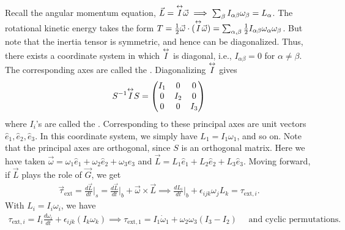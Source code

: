Recall the angular momentum equation, $\vec{L} = \overset{\leftrightarrow}{I} \vec{\omega} \implies \sum_{\beta} I_{\alpha \beta} \omega_{\beta} = L_{\alpha}$. The rotational kinetic energy takes the form $T = \frac{1}{2} \vec{\omega} \cdot (\overset{\leftrightarrow}{I} \vec{\omega}) = \sum_{\alpha,\beta} \frac{1}{2} I_{\alpha \beta} \omega_{\alpha} \omega_{\beta}$. But note that the inertia tensor is symmetric, and hence can be diagonalized. Thus, there exists a coordinate system in which $\overset{\leftrightarrow}{I}$ is diagonal, i.e., $I_{\alpha \beta} = 0$ for $\alpha \neq \beta$. The corresponding axes are called the . Diagonalizing $\overset{\leftrightarrow}{I}$ gives
\begin{align}
    S^{-1} \overset{\leftrightarrow}{I} S = \begin{pmatrix}
        I_{1} & 0 & 0 \\
        0 & I_{2} & 0 \\
        0 & 0 & I_{3}
    \end{pmatrix}
\end{align}
where $I_{i}$'s are called the . Corresponding to these principal axes are unit vectors $\hat{e}_{1},\hat{e}_{2},\hat{e}_{3}$. In this coordinate system, we simply have $L_{1} = I_{1}\omega_{1}$, and so on. Note that the principal axes are orthogonal, since $S$ is an orthogonal matrix. Here we have taken $\vec{\omega} = \omega_{1} \hat{e}_{1} + \omega_{2} \hat{e}_{2} + \omega_{3} \hat{e}_{3}$ and $\vec{L} = L_{1} \hat{e}_{1} + L_{2} \hat{e}_{2} + L_{3} \hat{e}_{3}$. Moving forward, if $\vec{L}$ plays the role of $\vec{G}$, we get
\begin{align}
    \vec{\tau}_{\text{ext}} = \frac{d\vec{L}}{dt}\Big|_{s} = \frac{d\vec{L}}{dt}\Big|_{b} + \vec{\omega} \times \vec{L} \implies \frac{dL_{i}}{dt}\Big|_{b} + \epsilon_{ijk} \omega_{j} L_{k} = \tau_{\text{ext},i}.
\end{align}
With $L_{i} = I_{i} \omega_{i}$, we have
\begin{align}
    \tau_{\text{ext},i} = I_{i} \frac{d\omega_{i}}{dt} + \epsilon_{ijk} (I_{k} \omega_{k}) \implies \tau_{\text{ext},1} = I_{1}\dot{\omega}_{1} + \omega_{2}\omega_{3}(I_{3}-I_{2}) \quad \text{ and cyclic permutations.}
\end{align}

